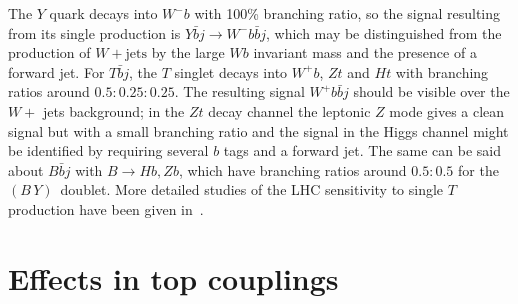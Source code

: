 \documentclass[12pt,a4paper]{article}
\newcommand{\by}{$(B\,Y)$}
\begin{document}
The $Y$ quark decays into $W^- b$ with 100\% branching ratio, so the signal resulting from its single production is $Y \bar b j \to W^- b \bar b j$, which may be distinguished from the production of $W+\text{jets}$ by the large $Wb$ invariant mass and the presence of a forward jet. For $T \bar b j$, the $T$ singlet decays into $W^+ b$, $Zt$ and $Ht$ with branching ratios around $0.5:0.25:0.25$. The resulting signal $W^+b \bar b j$ should be visible over the $W+$ jets background; in the $Zt$ decay channel the leptonic $Z$ mode gives a clean signal but with a small branching ratio and the signal in the Higgs channel might be identified by requiring several $b$ tags and a forward jet. The same can be said about $B \bar b j$ with $B \to Hb,Zb$, which have branching ratios around $0.5:0.5$ for the \by\ doublet. More detailed studies of the LHC sensitivity to single $T$ production have been given in~\cite{Azuelos:2004dm,Yue:2009cq,Vignaroli:2012sf}.



\section{Effects in top couplings}
\label{sec:top}
\end{document}

